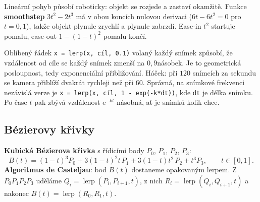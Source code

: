 \begin{center}
\end{center}

Lineární pohyb působí roboticky: objekt se rozjede a zastaví okamžitě. Funkce \textbf{smoothstep} $3t^2 - 2t^3$ má v obou koncích nulovou derivaci ($6t - 6t^2 = 0$ pro $t = 0, 1$), takže objekt plynule zrychlí a plynule zabrzdí. Ease-in $t^2$ startuje pomalu, ease-out $1 - (1 - t)^2$ pomalu končí.

\begin{note}
  Oblíbený řádek \texttt{x = lerp(x, cíl, 0.1)} volaný každý snímek způsobí, že vzdálenost od cíle se každý snímek zmenší na $0{,}9$násobek. Je to geometrická posloupnost, tedy exponenciální přibližování. Háček: při $120$ snímcích za sekundu se kamera přiblíží dvakrát rychleji než při $60$. Správná, na snímkové frekvenci nezávislá verze je \texttt{x = lerp(x, cíl, 1 - exp(-k*dt))}, kde \texttt{dt} je délka snímku. Po čase $t$ pak zbývá vzdálenost $\mathrm{e}^{-kt}$-násobná, ať je snímků kolik chce.
\end{note}

\subsection{Bézierovy křivky}

\begin{definitionbox}
  \textbf{Kubická Bézierova křivka} s řídicími body $P_0$, $P_1$, $P_2$, $P_3$:
  \begin{equation*}
    B(t) = (1 - t)^3P_0 + 3(1 - t)^2t\,P_1 + 3(1 - t)t^2\,P_2 + t^3P_3,\qquad t\in[0, 1].
  \end{equation*}
  \textbf{Algoritmus de Casteljau}: bod $B(t)$ dostaneme opakovaným lerpem. Z $P_0P_1P_2P_3$ uděláme $Q_i = \operatorname{lerp}(P_i, P_{i+1}, t)$, z nich $R_i = \operatorname{lerp}(Q_i, Q_{i+1}, t)$ a nakonec $B(t) = \operatorname{lerp}(R_0, R_1, t)$.
\end{definitionbox}

